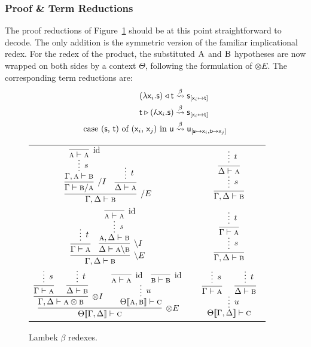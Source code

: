 \subsubsection{Proof \& Term Reductions}
The proof reductions of Figure~\ref{figure:lambek_proof_reductions} should be at this point straightforward to decode.
The only addition is the symmetric version of the familiar implicational redex.
For the redex of the product, the substituted $\normalfont\textsc{A}$ and $\normalfont\textsc{B}$ hypotheses are now wrapped on both sides by a context $\Theta$, following the formulation of $\otimes E$.
The corresponding term reductions are:
\begin{align}
(\term{\lam \vari .s})\appright\term{t} & \bred \term{s}_{[\term{\vari } \mapsto \term{t}]}\\
\term{t}\appleft(\term{\adbmal \vari .s}) & \bred \term{s}_{[\term{\vari } \mapsto \term{t}]}\\
\cterm{case (\smallterm{s}, \smallterm{t}) of (\smallterm{\vari }, \smallterm{\varj}) in \smallterm{u}} & \bred \term{u_{[\term{s} \mapsto \term{\vari }, \term{t} \mapsto \term{\varj}]}}
\end{align}

\begin{figure}
	\centering
	\begin{tabularx}{0.95\textwidth}{@{}ccc@{}}
	$\infer[\divright E]{\Gamma, \Delta \vdash \prop{b}}{
	\infer[\divright I]{\Gamma \vdash \prop{b} \divright \prop{a}}{
		\infer*[s]{\Gamma, \prop{a} \vdash \prop{b}}{
				\infer[\Ax]{\prop{a} \vdash \prop{a}}{} 
			}
		}
		&
		\infer{\Delta \vdash \prop{a}}{
			\infer*[t]{}{}
		}
	}$
	&
	\raisebox{20pt}{$\implies$}
	&
	$ 
	\infer[]{\Gamma, \Delta \vdash \prop{b}}{
		\infer*[s]{}{
		\infer[]{\Delta \vdash \prop{a}}{
			\infer*[t]{}{}
		}}
	}
	$\\[\smallsep]
	$\infer[\divleft E]{\Gamma, \Delta \vdash \prop{b}}{
		\infer{\Gamma \vdash \prop{a}}{
			\infer*[t]{}{}
		}
		&
		\infer[\divleft I]{\Delta \vdash \prop{a} \divleft \prop{b}}{
			\infer*[s]{\prop{a}, \Delta \vdash \prop{b}}{
				\infer[\Ax]{\prop{a} \vdash \prop{a}}{} 
			}
		}
	}$
	&
	\raisebox{20pt}{$\implies$}
	&
	$ 
	\infer[]{\Gamma, \Delta \vdash \prop{b}}{
		\infer*[s]{}{
		\infer[]{\Gamma \vdash \prop{a}}{
			\infer*[t]{}{}
		}}
	}
	$\\[\smallsep]
	$
	\infer[\otimes E]{\Theta\ctx{\Gamma, \Delta} \vdash \prop{c}}{
		\infer[\otimes I]{\Gamma, \Delta \vdash \prop{a} \otimes \prop{b}}{
			\infer[]{\Gamma \vdash \prop{a}}{\infer*[s]{}{}}
			&
			\infer[]{\Delta \vdash \prop{b}}{\infer*[t]{}{}}
		}		
		&
		\infer*[u]{\Theta\ctx{\prop{a}, \prop{b}} \vdash \prop{c}}{
			\infer[\Ax]{\prop{a} \vdash \prop{a}}{}
			& 
			\infer[\Ax]{\prop{b} \vdash \prop{b}}{}
		}
	}
	$
	&
	\raisebox{20pt}{$\implies$}
	&
	$
	\infer*[u]{\Theta\ctx{\Gamma, \Delta} \vdash \prop{c}}{
		\infer[]{\Gamma \vdash \prop{a}}{
			\infer*[s]{}{}
		}
		&
		\infer[]{\Delta \vdash \prop{b}}{
			\infer*[t]{}{}
		}
	}
	$
	\end{tabularx}
	\caption{Lambek $\beta$ redexes.}
	\label{figure:lambek_proof_reductions}
\end{figure}

